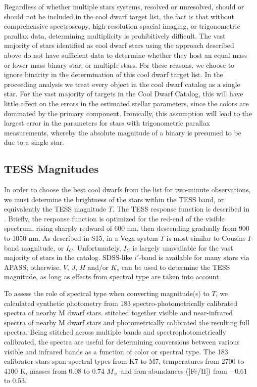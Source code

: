 \documentclass[twocolumn]{aastex62}
\begin{document}
Regardless of whether multiple stars systems, resolved or unresolved, should or should not be included in the cool dwarf target list, the fact is that without comprehensive spectroscopy, high-resolution spacial imaging, or trigonometric parallax data, determining multiplicity is prohibitively difficult.  The vast majority of stars identified as cool dwarf stars using the approach described above do not have sufficient data to determine whether they host an equal mass or lower mass binary star, or multiple stars.  For these reasons, we choose to ignore binarity in the determination of this cool dwarf target list. In the proceeding analysis we treat every object in the cool dwarf catalog as a single star.  For the vast majority of targets in the Cool Dwarf Catalog, this will have little affect on the errors in the estimated stellar parameters, since the colors are dominated by the primary component.  Ironically, this assumption will lead to the largest error in the parameters for stars with trigonometric parallax measurements, whereby the absolute magnitude of a binary is presumed to be due to a single star.  

\subsection{TESS Magnitudes}

In order to choose the best cool dwarfs from the list for two-minute observations, we must determine the brightness of the stars within the TESS band, or equivalently the TESS magnitude $T$.  The TESS response function is described in \citet{Ricker2015}.  Briefly, the response function is optimized for the red-end of the visible spectrum, rising sharply redward of 600 nm, then descending gradually from 900 to 1050 nm.  As described in S15, in a Vega system $T$ is most similar to Cousins $I$-band magnitude, or $I_C$.  Unfortunately, $I_C$ is largely unavailable for the vast majority of stars in the catalog.  SDSS-like $i'$-band is available for many stars via APASS; otherwise, $V$, $J$, $H$ and/or $K_s$ can be used to determine the TESS magnitude, as long as effects from spectral type are taken into account.

To assess the role of spectral type when converting magnitude(s) to $T$, we calculated synthetic photometry from 183 spectro-photometrically calibrated spectra of nearby M dwarf stars. \citet[][]{Mann2015} stitched together visible and near-infrared spectra of nearby M dwarf stars and photometrically calibrated the resulting full spectra.  Being stitched across multiple bands and spectrophotometrically calibrated, the spectra are useful for determining conversions between various visible and infrared bands as a function of color or spectral type.  The 183 calibrator stars span spectral types from K7 to M7, temperatures from 2700 to 4100 K, masses from 0.08 to 0.74 $M_\sun$ and iron abundances ([Fe/H]) from $-0.61$ to 0.53.
\end{document}
